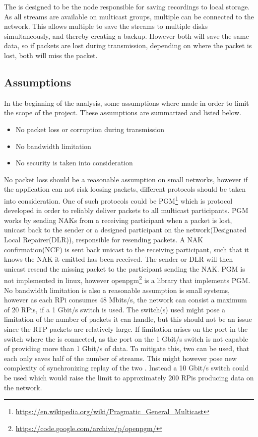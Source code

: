 The \hist{} is designed to be the node responsible for saving recordings to local storage. As all streams are available on multicast groups, multiple \hist{} can be connected to the network. This allows multiple \hist{} to save the streams to multiple disks simultaneously, and thereby creating a backup. However both \hist{} will save the same data, so if packets are lost during transmission, depending on where the packet is lost, both  will miss the packet.\\

\subsection{Assumptions}
\noindent{}In the beginning of the analysis, some assumptions where made in order to limit the scope of the project. These assumptions are summarized and listed below.
\begin{itemize}
	\item No packet loss or corruption during transmission
	\item No bandwidth limitation
	\item No security is taken into consideration
\end{itemize}

No packet loss should be a reasonable assumption on small networks, however if the application can not risk loosing packets, different protocols should be taken into consideration.
One of such protocols could be \ac{PGM}\footnote{\url{https://en.wikipedia.org/wiki/Pragmatic\_General\_Multicast}} which is protocol developed in order to reliably deliver packets to all multicast participants.
PGM works by sending NAKs from a receiving participant when a packet is lost, unicast back to the sender or a designed participant on the network(Designated Local Repairer(DLR)), responsible for resending packets. A NAK confirmation(NCF) is sent back unicast to the receiving participant, such that it knows the NAK it emitted has been received. The sender or DLR will then unicast resend the missing packet to the participant sending the NAK. PGM is not implemented in linux, however openpgm\footnote{\url{https://code.google.com/archive/p/openpgm/}} is a library that implements PGM.\\

\noindent{}No bandwidth limitation is also a reasonable assumption is small systems, however as each RPi consumes 48 Mbits/s, the network can consist a maximum of 20 RPis, if a 1 Gbit/s switch is used. The switch(s) used might pose a limitation of the number of packets it can handle, but this should not be an issue since the RTP packets are relatively large.  If limitation arises on the port in the switch where the \hist{} is connected, as the port on the 1 Gbit/s switch is not capable of providing more than 1 Gbit/s of data. To mitigate this, two \hist{} can be used, that each only saves half of the number of streams. This might however pose new complexity of synchronizing replay of the two . Instead a 10 Gbit/s switch could be used which would raise the limit to approximately 200 RPis producing data on the network.\\

